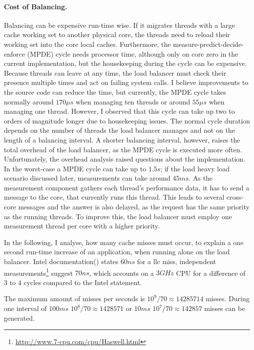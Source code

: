 \paragraph{Cost of Balancing.}
Balancing can be expensive run-time wise.
If it migrates threads with a large cache working set to another physical core,
the threads need to reload their working set into the core local caches.
Furthermore, the measure-predict-decide-enforce (MPDE) cycle needs processor time,
although only on core zero in the current implementation, but the housekeeping
during the cycle can be expensive.
Because threads can leave at any time, the load balancer must check their
presence multiple times and act on failing system calls.
I believe improvements to the source code can reduce the time, but currently,
the MPDE cycle takes normally around $170\mu{}s$ when managing ten threads or around
$55\mu{}s$ when managing one thread.
However, I observed that this cycle can take up two to orders of magnitude
longer due to housekeeping issues.
The normal cycle duration depends on the number of threads the load
balancer manages and not on the length of a balancing interval.
A shorter balancing interval, however, raises the total overhead of the load
balancer, as the MPDE cycle is executed more often.
Unfortunately, the overhead analysis raised questions about the implementation.
In the worst-case a MPDE cycle can take up to $1.5s$; if the load
heavy load scenario discussed later, measurements can take around $45ms$.
As the measurement component gathers each thread's performance data, it has to
send a message to the core, that currently runs this thread.
This leads to several cross-core messages and the answer is also delayed, as
the request has the same priority as the running threads.
To improve this, the load balancer must employ one measurement thread per core
with a higher priority.

In the following, I analyse, how many cache misses must occur, to explain a one
second run-time increase of an application, when running alone on the load
balancer.
Intel documentation(\cite{intel_perf_analysis_2009}) states $60ns$ for a
\gls{llc} miss, independent
measurements\footnote{\url{http://www.7-cpu.com/cpu/Haswell.html}}
suggest $70ns$, which accounts on a $3\textit{GHz}$ CPU for a difference of $3$ to $4$ cycles
compared to the Intel statement.

The maximum amount of misses per seconds is $10^9/70 \approx 14285714$ misses.
During one interval of $100ms$ $10^8/70 \approx 1428571$ or $10ms$ $10^7/70 \approx
142857$ misses can be generated.

